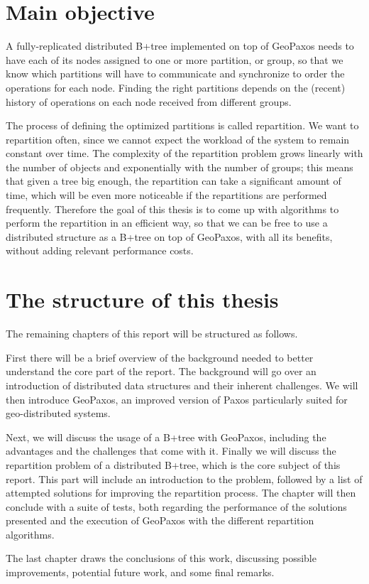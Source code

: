 \section{Main objective}\label{sec:main-objective}
A fully-replicated distributed B+tree implemented on top of GeoPaxos needs to have each of its nodes assigned to one or more partition, or group, so that we know which partitions will have to communicate and synchronize to order the operations for each node. Finding the right partitions depends on the (recent) history of operations on each node received from different groups.

The process of defining the optimized partitions is called repartition. We want to repartition often, since we cannot expect the workload of the system to remain constant over time. The complexity of the repartition problem grows linearly with the number of objects and exponentially with the number of groups; this means that given a tree big enough, the repartition can take a significant amount of time, which will be even more noticeable if the repartitions are performed frequently. Therefore the goal of this thesis is to come up with algorithms to perform the repartition in an efficient way, so that we can be free to use a distributed structure as a B+tree on top of GeoPaxos, with all its benefits, without adding relevant performance costs.

\section{The structure of this thesis}\label{the-structure-of-this-thesis}
The remaining chapters of this report will be structured as follows.

First there will be a brief overview of the background needed to better understand the core part of the report. The background will go over an introduction of distributed data structures and their inherent challenges. We will then introduce GeoPaxos, an improved version of Paxos particularly suited for geo-distributed systems. 

Next, we will discuss the usage of a B+tree with GeoPaxos, including the advantages and the challenges that come with it. Finally we will discuss the repartition problem of a distributed B+tree, which is the core subject of this report. This part will include an introduction to the problem, followed by a list of attempted solutions for improving the repartition process. The chapter will then conclude with a suite of tests, both regarding the performance of the solutions presented and the execution of GeoPaxos with the different repartition algorithms.

The last chapter draws the conclusions of this work, discussing possible improvements, potential future work, and some final remarks.